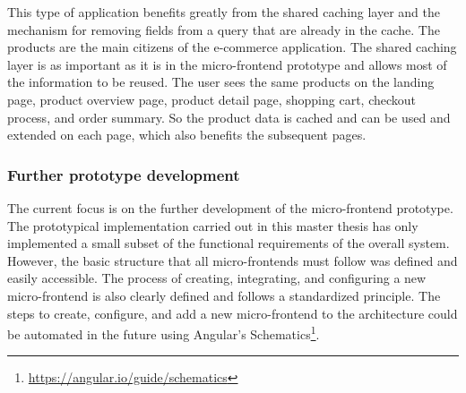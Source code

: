 \bigskip

\noindent This type of application benefits greatly from the shared caching layer and the mechanism for removing fields from a query that are already in the cache. The products are the main citizens of the e-commerce application. The shared caching layer is as important as it is in the micro-frontend prototype and allows most of the information to be reused. The user sees the same products on the landing page, product overview page, product detail page, shopping cart, checkout process, and order summary. So the product data is cached and can be used and extended on each page, which also benefits the subsequent pages.

\subsubsection{Further prototype development}

The current focus is on the further development of the micro-frontend prototype. The prototypical implementation carried out in this master thesis has only implemented a small subset of the functional requirements of the overall system. However, the basic structure that all micro-frontends must follow was defined and easily accessible. The process of creating, integrating, and configuring a new micro-frontend is also clearly defined and follows a standardized principle. The steps to create, configure, and add a new micro-frontend to the architecture could be automated in the future using Angular's Schematics\footnote{\url{https://angular.io/guide/schematics}}.
